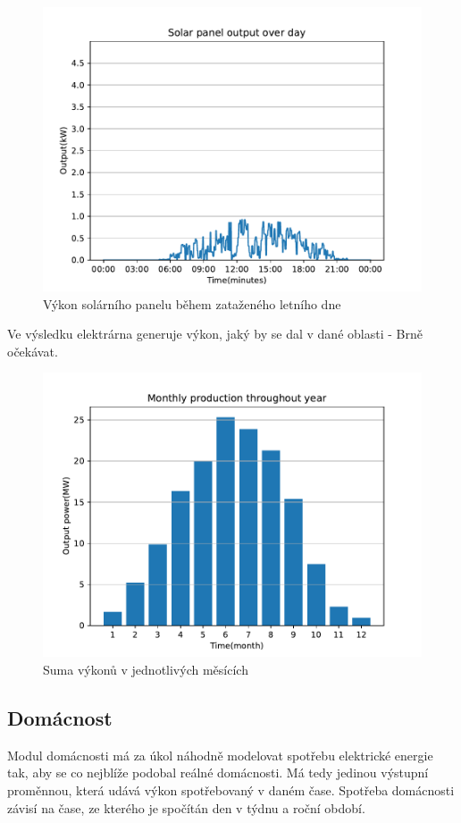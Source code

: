\documentclass[12pt,a4paper]{article}
\begin{document}
\begin{figure}
\includegraphics[width=\linewidth]{img/solar_day_cloudy.pdf}
\caption{Výkon solárního panelu během zataženého letního dne}
\label{fig:solar_day_cloudy}
\end{figure}

Ve výsledku elektrárna generuje výkon, jaký by se dal v dané oblasti - Brně očekávat. \cite{zilvar_2022}

\begin{figure}
\includegraphics[width=\linewidth]{img/solar_power_hist.pdf}
\caption{Suma výkonů v jednotlivých měsících}
\label{fig:solar_power_hist}
\end{figure}

\subsection{Domácnost}
Modul domácnosti má za úkol náhodně modelovat spotřebu elektrické energie tak,
aby se co nejblíže podobal reálné domácnosti.
Má tedy jedinou výstupní proměnnou, která udává výkon spotřebovaný v daném čase.
Spotřeba domácnosti závisí na čase, ze kterého je spočítán den v týdnu a roční období.
\end{document}
